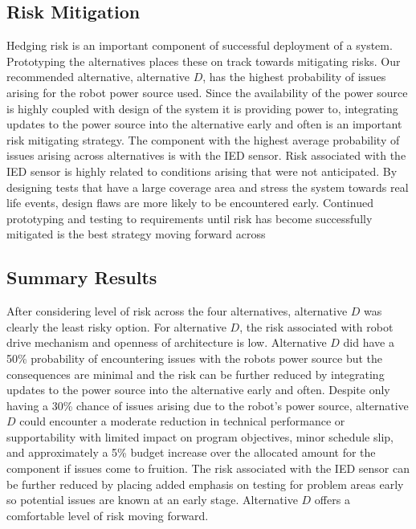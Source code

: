 \documentclass[letterpaper,10pt]{article}
\begin{document}
\subsection{Risk Mitigation}
Hedging risk is an important component of successful deployment of a system. Prototyping the alternatives places these on track towards mitigating risks. Our recommended alternative, alternative $D$, has the highest probability of issues arising for the robot power source used. Since the availability of the power source is highly coupled with design of the system it is providing power to, integrating updates to the power source into the alternative early and often is an important risk mitigating strategy. The component with the highest average probability of issues arising across alternatives is with the IED sensor. Risk associated with the IED sensor is highly related to conditions arising that were not anticipated. By designing tests that have a large coverage area and stress the system towards real life events, design flaws are more likely to be encountered early. Continued prototyping and testing to requirements until risk has become successfully mitigated is the best strategy moving forward across 
\subsection{Summary Results}
After considering level of risk across the four alternatives, alternative $D$ was clearly the least risky option. For alternative $D$, the risk associated with robot drive mechanism and openness of architecture is low. Alternative $D$ did have a 50\% probability of encountering issues with the robots power source but the consequences are minimal and the risk can be further reduced by integrating updates to the power source into the alternative early and often. Despite only having a 30\% chance of issues arising due to the robot's power source, alternative $D$ could encounter a moderate reduction in technical performance or supportability with limited impact on program objectives, minor schedule slip, and approximately a 5\% budget increase over the allocated amount for the component if issues come to fruition. The risk associated with the IED sensor can be further reduced by placing added emphasis on testing for problem areas early so potential issues are known at an early stage. Alternative $D$ offers a comfortable level of risk moving forward.
\appendix
\pagebreak
\end{document}
